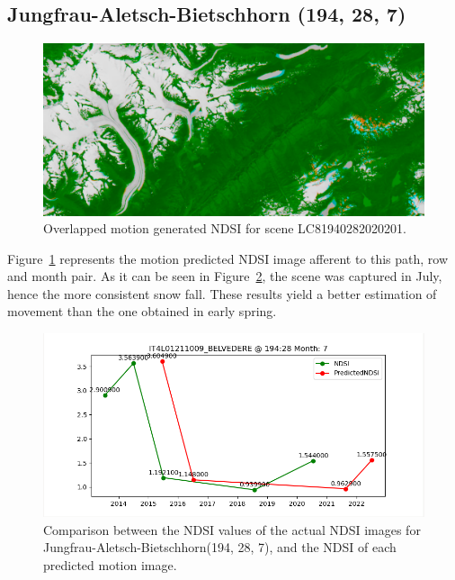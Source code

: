 \documentclass[12pt, a4paper]{report}
\begin{document}
	
	\newpage{}
	
	\subsection{Jungfrau-Aletsch-Bietschhorn (194, 28, 7)}
	
	\begin{figure}[h!]
		\centering
		\includegraphics[width=\linewidth]{../images/experiment_1940287_image.png}
		\caption{Overlapped motion generated NDSI for scene LC81940282020201.}
		\label{fig:experiment_1940287_image}
	\end{figure}
	
	Figure~\ref{fig:experiment_1940287_image} represents the motion predicted NDSI image afferent to this path, row and month pair. As it can be seen in Figure~\ref{fig:jungfrau_194287}, the scene was captured in July, hence the more consistent snow fall. These results yield a better estimation of movement than the one obtained in early spring.
	
	\begin{figure}[h!]
		\centering
		\includegraphics[scale=0.5]{../images/experiment_194287.png}
		\caption{Comparison between the NDSI values of the actual NDSI images for Jungfrau-Aletsch-Bietschhorn(194, 28, 7), and the NDSI of each predicted motion image.}
		\label{fig:jungfrau_194287}
	\end{figure}
\end{document}
